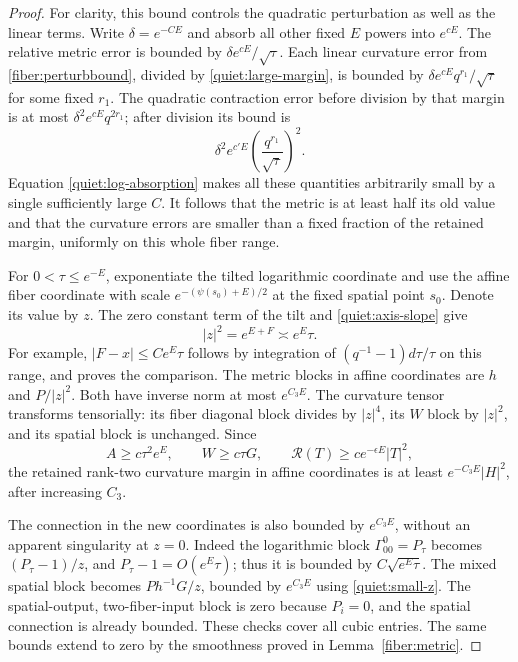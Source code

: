 \begin{proof}
For clarity, this bound controls the quadratic perturbation as well
as the linear terms.  Write \(\delta=e^{-CE}\) and absorb all other
fixed \(E\) powers into \(e^{cE}\).  The relative metric error is bounded
by \(\delta e^{cE}/\sqrt\tau\).  Each linear curvature error from
\eqref{fiber:perturbbound}, divided by
\eqref{quiet:large-margin}, is bounded by
\(\delta e^{cE}q^{r_1}/\sqrt\tau\) for some fixed \(r_1\).
The quadratic contraction error before division by that margin is
at most \(\delta^2e^{cE}q^{2r_1}\); after division its bound is
\[
 \delta^2e^{c'E}\left(\frac{q^{r_1}}{\sqrt\tau}\right)^2.
\]
Equation \eqref{quiet:log-absorption} makes all these quantities
arbitrarily small by a single sufficiently large \(C\).  It follows that
the metric is at least half its old value and that the curvature
errors are smaller than a fixed fraction of the retained margin,
uniformly on this whole fiber range.

For \(0<\tau\le e^{-E}\), exponentiate the tilted logarithmic
coordinate and use the affine fiber coordinate with scale
\(e^{-(\psi(s_0)+E)/2}\) at the fixed spatial point \(s_0\).
Denote its value by \(z\).  The zero constant term of the tilt and
\eqref{quiet:axis-slope} give
\begin{equation}\label{quiet:small-z}
 |z|^2=e^{E+F}\asymp e^E\tau.
\end{equation}
For example, \(|F-x|\le Ce^E\tau\) follows by integration of
\((q^{-1}-1)d\tau/\tau\) on this range, and proves the comparison.
The metric blocks in affine coordinates are \(h\) and \(P/|z|^2\).
Both have inverse norm at most \(e^{C_3E}\).  The curvature tensor
transforms tensorially: its fiber diagonal block divides by \(|z|^4\),
its \(W\) block by \(|z|^2\), and its spatial block is unchanged.
Since
\[
 A\ge c\tau^2e^E,\qquad W\ge c\tau G,\qquad
 \mathcal R(T)\ge c e^{-\epsilon E}|T|^2,
\]
the retained rank-two curvature margin in affine coordinates is at
least \(e^{-C_3E}|H|^2\), after increasing \(C_3\).

The connection in the new coordinates is also bounded by
\(e^{C_3E}\), without an apparent singularity at \(z=0\).
Indeed the logarithmic block \(\Gamma^0_{00}=P_\tau\) becomes
\((P_\tau-1)/z\), and
\(P_\tau-1=O(e^E\tau)\); thus it is bounded by
\(C\sqrt{e^E\tau}\).  The mixed spatial block becomes
\(Ph^{-1}G/z\), bounded by \(e^{C_3E}\) using
\eqref{quiet:small-z}.  The spatial-output, two-fiber-input block is
zero because \(P_i=0\), and the spatial connection is already bounded.
These checks cover all cubic entries.  The same bounds extend to zero
by the smoothness proved in Lemma~\ref{fiber:metric}.


\end{proof}
